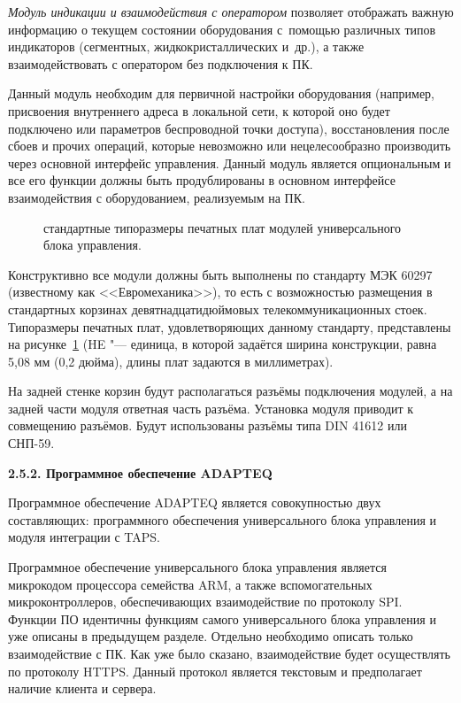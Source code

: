 \textit{Модуль индикации и взаимодействия с оператором} позволяет отображать важную информацию о текущем состоянии оборудования с~помощью различных типов индикаторов (сегментных, жидкокристаллических и~др.), а также взаимодействовать с оператором без подключения к ПК.

Данный модуль необходим для первичной настройки оборудования (например, присвоения внутреннего адреса в локальной сети, к которой оно будет подключено или параметров беспроводной точки доступа), восстановления после сбоев и прочих операций, которые невозможно или нецелесообразно производить через основной интерфейс управления. Данный модуль является опциональным и все его функции должны быть продублированы в основном интерфейсе взаимодействия с оборудованием, реализуемым на ПК.

\begin{figure}[ht]
	\caption{стандартные типоразмеры печатных плат модулей универсального блока управления.}\label{fig:euromech}
\end{figure}

Конструктивно все модули должны быть выполнены по стандарту МЭК 60297 (известному как <<Евромеханика>>), то есть с возможностью размещения в стандартных корзинах девятнадцатидюймовых телекоммуникационных стоек. Типоразмеры печатных плат, удовлетворяющих данному стандарту, представлены на рисунке~\cref{fig:euromech} (\foreignlanguage{english}{HE} "--- единица, в которой задаётся ширина конструкции, равна 5,08 мм (0,2 дюйма), длины плат задаются в миллиметрах).

На задней стенке корзин будут располагаться разъёмы подключения модулей, а на задней части модуля ответная часть разъёма. Установка модуля приводит к совмещению разъёмов. Будут использованы разъёмы типа DIN 41612 или СНП-59.

\textbf{2.5.2. Программное обеспечение \foreignlanguage{english}{ADAPTEQ}}

Программное обеспечение \foreignlanguage{english}{ADAPTEQ} является совокупностью двух составляющих: программного обеспечения универсального блока управления и модуля интеграции с \foreignlanguage{english}{TAPS}. 

Программное обеспечение универсального блока управления является микрокодом процессора семейства \foreignlanguage{english}{ARM}, а также вспомогательных микроконтроллеров, обеспечивающих взаимодействие по протоколу \foreignlanguage{english}{SPI}. Функции ПО идентичны функциям самого универсального блока управления и уже описаны в предыдущем разделе. Отдельно необходимо описать только взаимодействие с ПК. Как уже было сказано, взаимодействие будет осуществлять по протоколу \foreignlanguage{english}{HTTPS}. Данный протокол является текстовым и предполагает наличие клиента и сервера.

